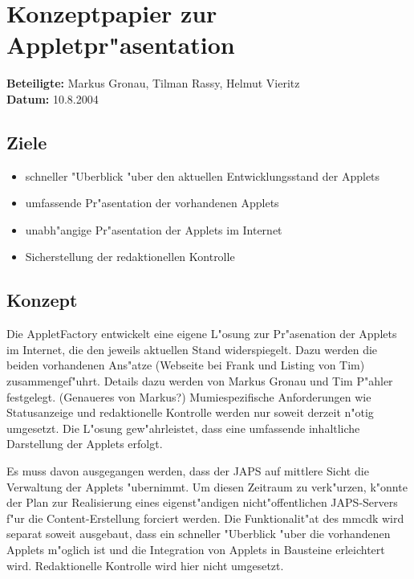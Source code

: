 \documentclass{article}
\begin{document}
\section*{Konzeptpapier zur Appletpr"asentation}
\textbf{Beteiligte:} Markus Gronau, Tilman Rassy, Helmut Vieritz\\
\textbf{Datum:} 10.8.2004

\subsection*{Ziele} \begin{itemize} \item schneller "Uberblick "uber den aktuellen
Entwicklungsstand der Applets \item umfassende Pr"asentation der vorhandenen Applets \item
unabh"angige Pr"asentation der Applets im Internet \item Sicherstellung der redaktionellen
Kontrolle \end{itemize} \subsection*{Konzept} Die AppletFactory entwickelt eine eigene
L"osung zur Pr"asenation der Applets im Internet, die den jeweils aktuellen Stand
widerspiegelt. Dazu werden die beiden vorhandenen Ans"atze (Webseite bei Frank und Listing
von Tim) zusammengef"uhrt. Details dazu werden von Markus Gronau und Tim P"ahler
festgelegt. (Genaueres von Markus?) Mumiespezifische Anforderungen wie Statusanzeige und
redaktionelle Kontrolle werden nur soweit derzeit n"otig umgesetzt. Die L"osung
gew"ahrleistet, dass eine umfassende inhaltliche Darstellung der Applets erfolgt.

Es muss davon ausgegangen werden, dass der JAPS auf mittlere Sicht die Verwaltung der
Applets "ubernimmt. Um diesen Zeitraum zu verk"urzen, k"onnte der Plan zur
Realisierung eines eigenst"andigen nicht"offentlichen JAPS-Servers f"ur die
Content-Erstellung forciert werden.  Die Funktionalit"at des mmcdk wird separat soweit
ausgebaut, dass ein schneller "Uberblick "uber die vorhandenen Applets m"oglich ist
und die Integration von Applets in Bausteine erleichtert wird. Redaktionelle Kontrolle wird
hier nicht umgesetzt.
\end{document}
